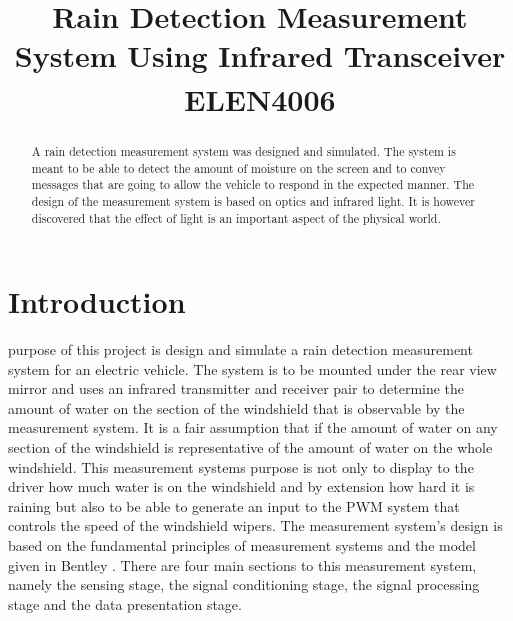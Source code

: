 \documentclass[conference, 11pt]{IEEEtran}
\begin{document}
\title{Rain Detection Measurement System Using Infrared Transceiver\\
{\footnotesize \textsuperscript{}ELEN4006}
}

\author{
\and
{}
}

\maketitle

\begin{abstract}
A rain detection measurement system was designed and simulated. The system is meant to be able to detect the amount of moisture on the screen and to convey messages that are going to allow the vehicle to respond in the expected manner. The design of the measurement system is based on optics and infrared light. It is however discovered that the effect of light is an important aspect of the physical world.
\end{abstract}



\section{Introduction}
 purpose of this project is design and simulate a rain detection measurement system for an electric vehicle. The system is to be mounted under the rear view mirror and uses an infrared transmitter and receiver pair to determine the amount of water on the section of the windshield that is observable by the measurement system. It is a fair assumption that if the amount of water on any section of the windshield is representative of the amount of water on the whole windshield. This measurement systems purpose is not only to display to the driver how much water is on the windshield and by extension how hard it is raining but also to be able to generate an input to the PWM system that controls the speed of the windshield wipers. The measurement system's design is based on the fundamental principles of measurement systems and the model given in Bentley \cite{BENT}. There are four main sections to this measurement system, namely the sensing stage, the signal conditioning stage, the signal processing stage and the data presentation stage. \\
\end{document}
